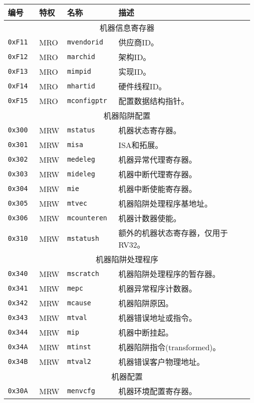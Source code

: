 \begin{table}[htb!]
\begin{center}
\begin{tabular}{|l|l|l|l|}
\hline
编号        & 特权  & 名称          & 描述 \\
\hline
\multicolumn{4}{|c|}{机器信息寄存器} \\
\hline
\tt 0xF11 & MRO &\tt mvendorid   & 供应商ID。 \\
\tt 0xF12 & MRO &\tt marchid     & 架构ID。 \\
\tt 0xF13 & MRO &\tt mimpid      & 实现ID。 \\
\tt 0xF14 & MRO &\tt mhartid     & 硬件线程ID。 \\
\tt 0xF15 & MRO &\tt mconfigptr  & 配置数据结构指针。 \\
\hline
\multicolumn{4}{|c|}{机器陷阱配置} \\
\hline
\tt 0x300 & MRW  &\tt mstatus    & 机器状态寄存器。 \\
\tt 0x301 & MRW  &\tt misa       & ISA和拓展。 \\
\tt 0x302 & MRW  &\tt medeleg    & 机器异常代理寄存器。 \\
\tt 0x303 & MRW  &\tt mideleg    & 机器中断代理寄存器。 \\
\tt 0x304 & MRW  &\tt mie        & 机器中断使能寄存器。 \\
\tt 0x305 & MRW  &\tt mtvec      & 机器陷阱处理程序基地址。 \\
\tt 0x306 & MRW  &\tt mcounteren & 机器计数器使能。 \\
\tt 0x310 & MRW  &\tt mstatush   & 额外的机器状态寄存器，仅用于RV32。 \\
\hline
\multicolumn{4}{|c|}{机器陷阱处理程序} \\
\hline
\tt 0x340 & MRW  &\tt mscratch   & 机器陷阱处理程序的暂存器。 \\
\tt 0x341 & MRW  &\tt mepc       & 机器异常程序计数器。\\
\tt 0x342 & MRW  &\tt mcause     & 机器陷阱原因。 \\
\tt 0x343 & MRW  &\tt mtval      & 机器错误地址或指令。 \\
\tt 0x344 & MRW  &\tt mip        & 机器中断挂起。 \\
\tt 0x34A & MRW  &\tt mtinst     & 机器陷阱指令(transformed)。 \\
\tt 0x34B & MRW  &\tt mtval2     & 机器错误客户物理地址。\\
\hline
\multicolumn{4}{|c|}{机器配置} \\
\hline
\tt 0x30A & MRW  &\tt menvcfg    & 机器环境配置寄存器。 \\

\end{tabular}
\end{center}
\end{table}
